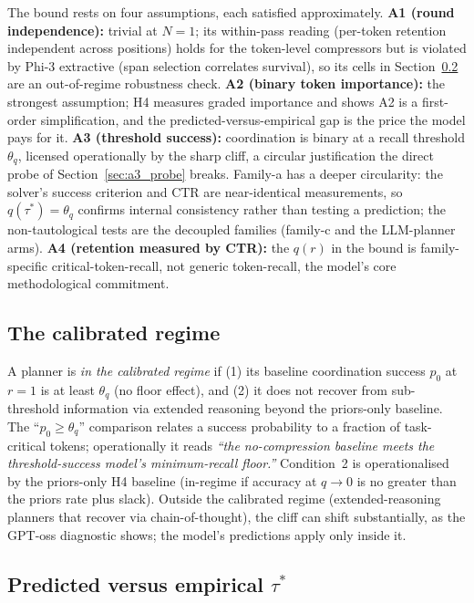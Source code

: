 The bound rests on four assumptions, each satisfied approximately.
\textbf{A1 (round independence):} trivial at $N=1$; its within-pass
reading (per-token retention independent across positions) holds for
the token-level compressors but is violated by Phi-3 extractive
(span selection correlates survival), so its cells in
Section~\ref{sec:cem_match} are an out-of-regime robustness check.
\textbf{A2 (binary token importance):} the strongest assumption; H4
measures graded importance and shows A2 is a first-order
simplification, and the predicted-versus-empirical gap is the price
the model pays for it. \textbf{A3 (threshold success):} coordination
is binary at a recall threshold $\theta_q$, licensed operationally by
the sharp cliff, a circular justification the direct probe of
Section~\ref{sec:a3_probe} breaks. Family-a has a deeper circularity: the solver's success criterion
and CTR are near-identical measurements, so $q(\tau^{*})=\theta_q$
confirms internal consistency rather than testing a prediction; the
non-tautological tests are the decoupled families (family-c and the
LLM-planner arms). \textbf{A4 (retention measured by CTR):} the
$q(r)$ in the bound is family-specific critical-token-recall, not
generic token-recall, the model's core methodological commitment.

\subsection{The calibrated regime}
\label{sec:calibrated}

A planner is \emph{in the calibrated regime} if (1) its baseline
coordination success $p_0$ at $r=1$ is at least $\theta_q$ (no floor
effect), and (2) it does not recover from sub-threshold information
via extended reasoning beyond the priors-only baseline. The
``$p_0\ge\theta_q$'' comparison relates a success probability to a
fraction of task-critical tokens; operationally it reads
\emph{``the no-compression baseline meets the threshold-success
model's minimum-recall floor.''} Condition~2 is operationalised by
the priors-only H4 baseline (in-regime if accuracy at $q\to0$ is no
greater than the priors rate plus slack). Outside the calibrated regime (extended-reasoning planners that
recover via chain-of-thought), the cliff can shift substantially,
as the GPT-oss diagnostic shows; the model's predictions apply
only inside it.

\subsection{Predicted versus empirical \texorpdfstring{$\tau^{*}$}{tau*}}
\label{sec:cem_match}

